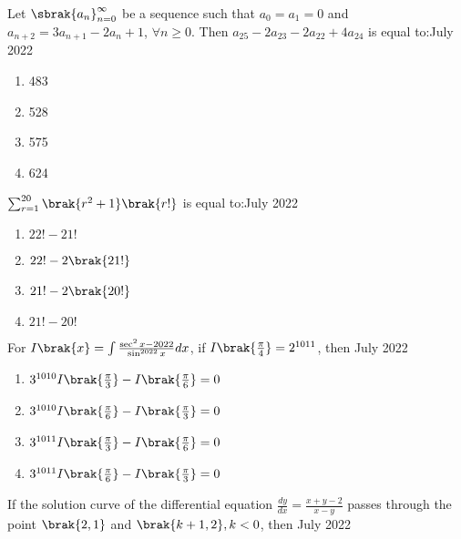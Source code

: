     \item Let $\sbrak{a_{n}}_{n=0}^{\infty}$ be a sequence such that $a_{0}=a_{1}=0$ and $a_{n+2}=3a_{n+1}-2a_{n}+1$, $\forall n\geq0$. Then $a_{25}-2a_{23}-2a_{22}+4a_{24}$ is equal to:\hfill{July 2022}

        \begin{multicols}{4}
        \begin{enumerate}
        \item 483
        \item 528
        \item 575
        \item 624
        \end{enumerate}
        \end{multicols}

    \item $\sum_{r=1}^{20}\brak{r^{2}+1}\brak{r!}$ is equal to:\hfill{July 2022}

        \begin{multicols}{4}
        \begin{enumerate}
        \item $22!-21!$
        \item $22!-2\brak{21!}$
        \item $21!-2\brak{20!}$
        \item $21!-20!$
        \end{enumerate}
        \end{multicols}

    \item For $I\brak{x}=\int\frac{\sec^{2}x-2022}{\sin^{2022}x}dx$, if $I\brak{\frac{\pi}{4}}=2^{1011}$, then \hfill{July 2022}

        \begin{enumerate}
        \item $3^{1010}I\brak{\frac{\pi}{3}}-I\brak{\frac{\pi}{6}}=0$
        \item $3^{1010}I\brak{\frac{\pi}{6}}-I\brak{\frac{\pi}{3}}=0$
        \item $3^{1011}I\brak{\frac{\pi}{3}}-I\brak{\frac{\pi}{6}}=0$
        \item $3^{1011}I\brak{\frac{\pi}{6}}-I\brak{\frac{\pi}{3}}=0$
        \end{enumerate}
      
    \item If the solution curve of the differential equation $\frac{dy}{dx}=\frac{x+y-2}{x-y}$ passes through the point $\brak{2,1}$ and $\brak{k+1,2},k<0$, then \hfill{July 2022}

